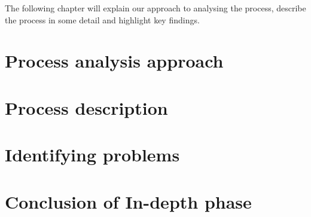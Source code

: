 The following chapter will explain our approach to analysing the process, describe the process in some detail and highlight key findings.

\section{Process analysis approach}

\section{Process description}

\section{Identifying problems}
\section{Conclusion of In-depth phase}
